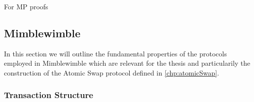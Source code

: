 For MP proofs \cite{klinec2020privacy}

\subsection{Mimblewimble}\label{sec:Mimblewimble}
In this section we will outline the fundamental properties of the protocols employed in Mimblewimble which are relevant for the thesis and particularily the construction of the Atomic Swap protocol defined in
\ref{chp:atomicSwap}.
\subsubsection{Transaction Structure}

